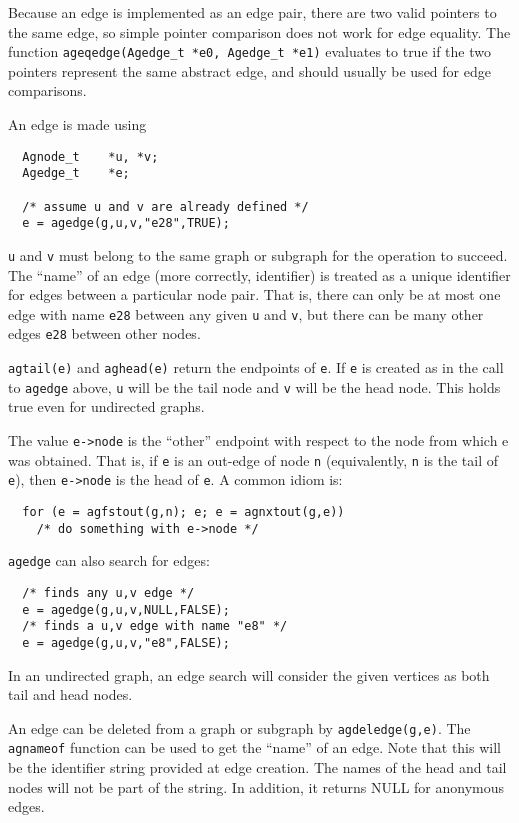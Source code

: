 \documentclass[11pt,letterpaper]{article}
\begin{document}
Because an edge is implemented as an edge pair, there are two valid pointers
to the same edge, so simple pointer comparison does not work for edge equality.
The function \verb"ageqedge(Agedge_t *e0, Agedge_t *e1)" evaluates to true if
the two pointers represent the same abstract edge, and should usually be used
for edge comparisons.

An edge is made using

\begin{verbatim}
  Agnode_t    *u, *v;
  Agedge_t    *e;
    
  /* assume u and v are already defined */
  e = agedge(g,u,v,"e28",TRUE);
\end{verbatim}

\verb"u" and \verb"v" must belong to the same graph or subgraph
for the operation to succeed.  The ``name'' of an edge
(more correctly, identifier) is treated as a unique identifier for edges
between a particular node pair.  That is, there can only be at most
one edge with name \verb"e28" between any given \verb"u" and \verb"v",
but there can be many other edges \verb"e28" between other nodes.

\verb"agtail(e)" and \verb"aghead(e)" return the endpoints of \verb"e".
If \verb"e" is created as in the call to \verb"agedge" above, \verb"u"
will be the tail node and \verb"v" will be the head node. This holds true
even for undirected graphs.

The value \verb"e->node" is the ``other'' endpoint
with respect to the node from which e was obtained.
That is, if \verb"e" is an out-edge of node \verb"n" (equivalently, \verb"n"
is the tail of \verb"e"), then \verb"e->node" is the head of \verb"e".
A common idiom is: 
\begin{verbatim}
  for (e = agfstout(g,n); e; e = agnxtout(g,e)) 
    /* do something with e->node */
\end{verbatim}

\verb"agedge" can also search for edges:

\begin{verbatim}
  /* finds any u,v edge */
  e = agedge(g,u,v,NULL,FALSE); 
  /* finds a u,v edge with name "e8" */
  e = agedge(g,u,v,"e8",FALSE); 
\end{verbatim}

In an undirected graph, an edge search will consider the given vertices
as both tail and head nodes.

An edge can be deleted from a graph or subgraph by \verb"agdeledge(g,e)".  
The \verb"agnameof" function can be used to get the ``name'' of an edge.
Note that this will be the identifier string provided at edge creation. 
The names
of the head and tail nodes will not be part of the string. In addition, it
returns NULL for anonymous edges.
\end{document}
